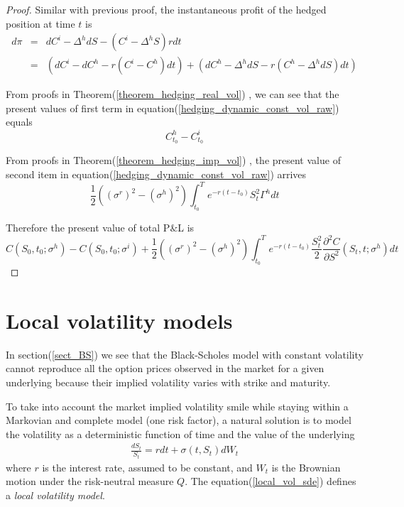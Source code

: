 \documentclass[10pt]{article}
\theoremstyle{plain}
\numberwithin{equation}{section}
\numberwithin{table}{section}
\newcommand{\s}{\sigma}
\newcommand{\prt}[1]{\left( #1 \right)}  %
\newcommand{\pa}{\partial}
\begin{document}
\begin{proof}
    Similar with previous proof, the instantaneous profit of the hedged position at time $t$ is
    \begin{eqnarray}
        d\pi &=& dC^i - \Delta^h dS - (C^i -\Delta^h S)rdt  \nonumber \\
        &=& \prt{dC^i - dC^h - r(C^i - C^h)dt} + \prt{dC^h - \Delta^h dS  - r(C^h-\Delta^h dS)dt}  
        \label{hedging_dynamic_const_vol_raw}
    \end{eqnarray}

    From proofs in Theorem(\ref{theorem_hedging_real_vol}) , we can see that the present values of first term in equation(\ref{hedging_dynamic_const_vol_raw}) equals
    \[
        C^h_{t_0} - C^i_{t_0}    
    \]

    From proofs in Theorem(\ref{theorem_hedging_imp_vol}) , the present value of second item in equation(\ref{hedging_dynamic_const_vol_raw}) arrives
    \[
        \frac{1}{2} \prt{(\s^r)^2 - (\s^h)^2 }  \int_{t_0}^T e^{-r(t-t_0)}  S^2_t \Gamma^h dt  
    \]
    
    Therefore the present value of total P$\&$L is 
    \[
        C(S_0,t_0;\s^h)-C(S_0,t_0;\s^i) + \frac{1}{2} \prt{(\s^r)^2-(\s^h)^2}\int_{t_0}^T e^{-r(t-t_0)}\frac{S_t^2}{2}\frac{\pa^2 C}{\pa S^2}(S_t,t;\s^h) dt   
    \]

\end{proof}


\newpage 
\section{Local volatility models}

In section(\ref{sect_BS}) we see that the Black-Scholes model with constant volatility
cannot reproduce all the option prices observed in the market for a given underlying
because their implied volatility varies with strike and maturity.

To take
into account the market implied volatility smile while staying within a Markovian
and complete model (one risk factor), a natural solution is to model the
volatility as a deterministic function of time and the value of the underlying
\begin{eqnarray}
  \frac{dS_t}{S_t} = rdt + \s(t, S_t)dW_t  
  \label{local_vol_sde}
\end{eqnarray}
where $r$ is the interest rate, assumed to be constant, and $W_t$ is the Brownian motion
under the risk-neutral measure $Q$. The equation(\ref{local_vol_sde}) defines a \emph{local volatility
model}.
\end{document}
